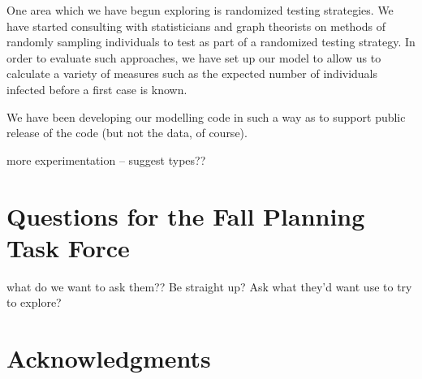 \documentclass[fleqn,10pt]{SelfArx} %
\newcommand{\ed}[1]{{\color{blue} #1}}
\begin{document}
One area which we have begun exploring is randomized testing strategies.  We have started consulting with statisticians and graph theorists on methods of randomly sampling individuals to test as part of a randomized testing strategy.  In order to evaluate such approaches, we have set up our model to allow us to calculate a variety of measures such as the expected number of individuals infected before a first case is known.

We have been developing our modelling code in such a way as to support public release of the code (but not the data, of course).

\ed{more experimentation -- suggest types??}

\section{Questions for the Fall Planning Task Force}

\ed{what do we want to ask them??  Be straight up?  Ask what they'd want use to try to explore?}

\section*{Acknowledgments} %






\end{document}
